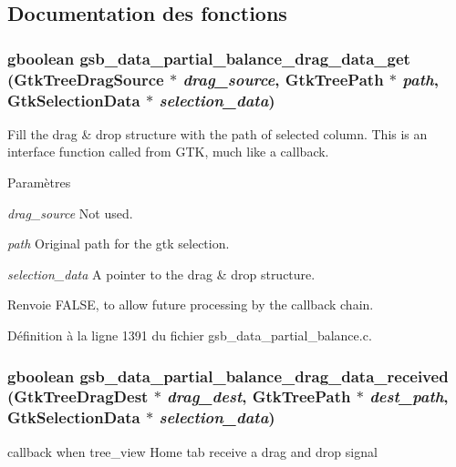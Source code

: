 \subsection{Documentation des fonctions}
\subsubsection[{gsb\_\-data\_\-partial\_\-balance\_\-drag\_\-data\_\-get}]{\setlength{\rightskip}{0pt plus 5cm}gboolean gsb\_\-data\_\-partial\_\-balance\_\-drag\_\-data\_\-get (GtkTreeDragSource $\ast$ {\em drag\_\-source}, \/  GtkTreePath $\ast$ {\em path}, \/  GtkSelectionData $\ast$ {\em selection\_\-data})}\label{gsb__data__partial__balance_8c_ae6b9a481d5b88820519dff2b7904824c}
Fill the drag \& drop structure with the path of selected column. This is an interface function called from GTK, much like a callback.


\begin{DoxyParams}{Paramètres}
\item[{\em drag\_\-source}]Not used. \item[{\em path}]Original path for the gtk selection. \item[{\em selection\_\-data}]A pointer to the drag \& drop structure.\end{DoxyParams}
\begin{DoxyReturn}{Renvoie}
FALSE, to allow future processing by the callback chain. 
\end{DoxyReturn}


Définition à la ligne 1391 du fichier gsb\_\-data\_\-partial\_\-balance.c.

\subsubsection[{gsb\_\-data\_\-partial\_\-balance\_\-drag\_\-data\_\-received}]{\setlength{\rightskip}{0pt plus 5cm}gboolean gsb\_\-data\_\-partial\_\-balance\_\-drag\_\-data\_\-received (GtkTreeDragDest $\ast$ {\em drag\_\-dest}, \/  GtkTreePath $\ast$ {\em dest\_\-path}, \/  GtkSelectionData $\ast$ {\em selection\_\-data})}\label{gsb__data__partial__balance_8c_a644c11f20828df365b13b5e5312f65a2}
callback when tree\_\-view Home tab receive a drag and drop signal


